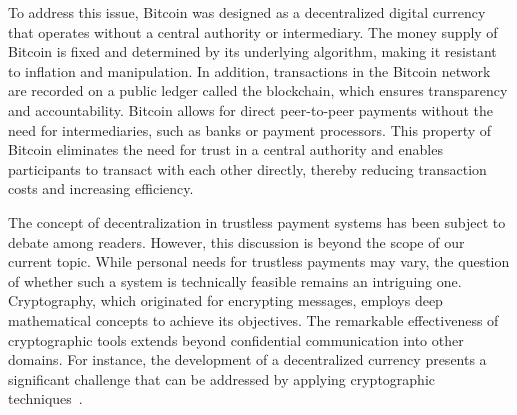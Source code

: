 To address this issue, Bitcoin was designed as a decentralized digital currency that operates without a central authority or intermediary. The
money supply of Bitcoin is fixed and determined by its underlying algorithm, making it resistant to inflation and manipulation. In addition,
transactions in the Bitcoin network are recorded on a public ledger called the blockchain, which ensures transparency and accountability.
Bitcoin allows for direct peer-to-peer payments without the need for intermediaries, such as banks or payment processors. This property of
Bitcoin eliminates the need for trust in a central authority and enables participants to transact with each other directly, thereby reducing
transaction costs and increasing efficiency.

The concept of decentralization in trustless payment systems has been subject to debate among readers. However, this discussion is beyond the
scope of our current topic. While personal needs for trustless payments may vary, the question of whether such a system is technically feasible
remains an intriguing one. Cryptography, which originated for encrypting messages, employs deep mathematical concepts to achieve its objectives.
The remarkable effectiveness of cryptographic tools extends beyond confidential communication into other domains. For instance, the development
of a decentralized currency presents a significant challenge that can be addressed by applying cryptographic techniques~\cite{diffie2022new}.


